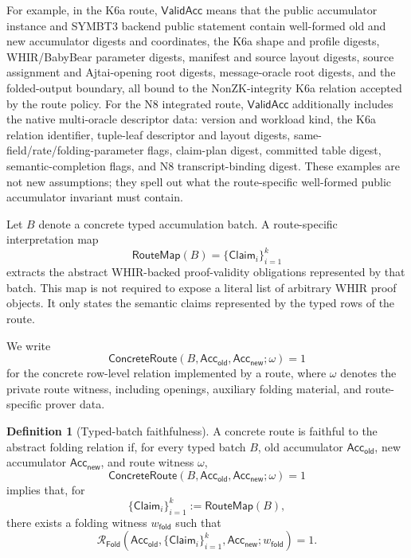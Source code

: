 \documentclass[11pt]{article}
\theoremstyle{definition}
\newtheorem{definition}[theorem]{Definition}
\newcommand{\Acc}{\mathsf{Acc}}
\newcommand{\Rfold}{\mathcal{R}_{\mathsf{Fold}}}
\begin{document}
For example, in the K6a route, \(\mathsf{ValidAcc}\) means that the public
accumulator instance and SYMBT3 backend public statement contain well-formed old
and new accumulator digests and coordinates, the K6a shape and profile digests,
WHIR/BabyBear parameter digests, manifest and source layout digests, source
assignment and Ajtai-opening root digests, message-oracle root digests, and the
folded-output boundary, all bound to the NonZK-integrity K6a relation accepted
by the route policy. For the N8 integrated route, \(\mathsf{ValidAcc}\)
additionally includes the native multi-oracle descriptor data: version and
workload kind, the K6a relation identifier, tuple-leaf descriptor and layout
digests, same-field/rate/folding-parameter flags, claim-plan digest, committed
table digest, semantic-completion flags, and N8 transcript-binding digest. These
examples are not new assumptions; they spell out what the route-specific
well-formed public accumulator invariant must contain.

Let \(B\) denote a concrete typed accumulation batch. A route-specific
interpretation map
\[
  \mathsf{RouteMap}(B)
  =
  \{\mathsf{Claim}_i\}_{i=1}^k
\]
extracts the abstract WHIR-backed proof-validity obligations represented by
that batch. This map is not required to expose a literal list of arbitrary WHIR
proof objects. It only states the semantic claims represented by the typed
rows of the route.

We write
\[
  \mathsf{ConcreteRoute}
  \left(
    B,
    \Acc_{\mathsf{old}},
    \Acc_{\mathsf{new}};
    \omega
  \right)=1
\]
for the concrete row-level relation implemented by a route, where
\(\omega\) denotes the private route witness, including openings, auxiliary
folding material, and route-specific prover data.

\begin{definition}[Typed-batch faithfulness]
\label{def:typed-batch-faithfulness}
A concrete route is faithful to the abstract folding relation if, for every
typed batch \(B\), old accumulator \(\Acc_{\mathsf{old}}\), new accumulator
\(\Acc_{\mathsf{new}}\), and route witness \(\omega\),
\[
  \mathsf{ConcreteRoute}
  \left(
    B,
    \Acc_{\mathsf{old}},
    \Acc_{\mathsf{new}};
    \omega
  \right)=1
\]
implies that, for
\[
  \{\mathsf{Claim}_i\}_{i=1}^k := \mathsf{RouteMap}(B),
\]
there exists a folding witness \(w_{\mathsf{fold}}\) such that
\[
  \Rfold\!\left(
    \Acc_{\mathsf{old}},
    \{\mathsf{Claim}_i\}_{i=1}^k,
    \Acc_{\mathsf{new}};
    w_{\mathsf{fold}}
  \right)=1.
\]
\end{definition}
\end{document}
